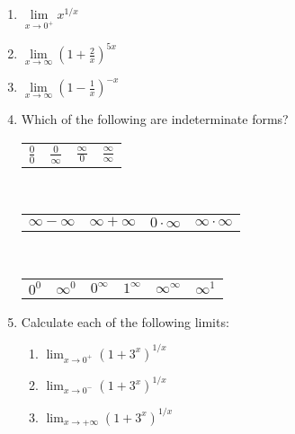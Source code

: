 \documentclass[12pt]{article}
\newif\ifans
\begin{document}
\begin{enumerate}
\ifans{\fbox{0}} \fi

\item $\lim\limits_{x\rightarrow 0^+} x^{1/x}$ 

\ifans{\fbox{0}} \fi

\item $\lim\limits_{x\rightarrow \infty} \left(1+\frac{2}{x}\right)^{5x}$ 

\ifans{\fbox{$e^{10}$}} \fi

\item $\lim\limits_{x\rightarrow \infty} \left(1-\frac{1}{x}\right)^{-x}$ 

\ifans{\fbox{$e$}} \fi

\item Which of the following are indeterminate forms?

\begin{center}
\begin{tabular}{cccc}
$\frac{0}{0}$ & $\frac{0}{\infty}$ & $\frac{\infty}{0}$& $\frac{\infty}{\infty}$
\end{tabular}\\
\medskip
\begin{tabular}{cccc}
$\infty-\infty$ & $\infty+\infty$ & $0 \cdot \infty$ & $\infty \cdot \infty$
\end{tabular}\\
\medskip
\begin{tabular}{cccccc}
$0^0$ & $\infty^0$ & $0^{\infty}$ & $1^\infty$ & $\infty^{\infty}$ & $\infty^{1}$
\end{tabular}
\end{center}

\ifans{\fbox{$\frac{0}{0}$, $\frac{\infty}{\infty}$, $\infty-\infty$, $0 \cdot \infty$, ${0}^{0}$, ${\infty}^{0}$, $1^{\infty}$}} \fi

\item Calculate each of the following limits:

\begin{enumerate}

\item $\lim_{x \rightarrow 0^{+}}{(1+3^x)^{1/x}}$

\ifans{\fbox{$+\infty$}} \fi

\item $\lim_{x \rightarrow 0^{-}}{(1+3^x)^{1/x}}$

\ifans{\fbox{$0$}} \fi

\item $\lim_{x \rightarrow +\infty}{(1+3^x)^{1/x}}$


\end{enumerate}
\end{enumerate}
\end{document}
